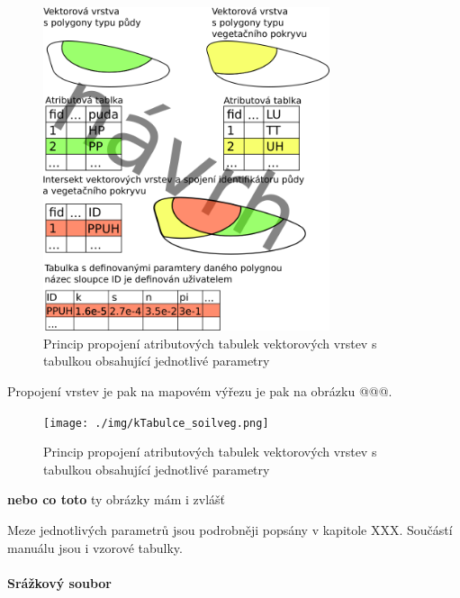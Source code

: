 \begin{figure}
  \centering
  \includegraphics[width=0.75\textwidth]{./img/spojenistabulkou.png}
  \caption{Princip propojení atributových tabulek vektorových vrstev s tabulkou obsahující jednotlivé parametry}
  \label{fig:pripravapar_detail}
\end{figure}

Propojení vrstev je pak na mapovém výřezu je pak na obrázku @@@.

\begin{figure}
  \centering
  \texttt{[image: ./img/kTabulce\_soilveg.png]}
  \caption{Princip propojení atributových tabulek vektorových vrstev s tabulkou obsahující jednotlivé parametry}
  \label{fig:pripravapar_vyrez}
\end{figure}

\textbf{nebo co toto} ty obrázky mám i zvlášť


Meze jednotlivých parametrů jsou podrobněji popsány v kapitole XXX. 
Součástí manuálu jsou i vzorové tabulky.



\paragraph{Srážkový soubor} \label{sec:vstupsrazka}

